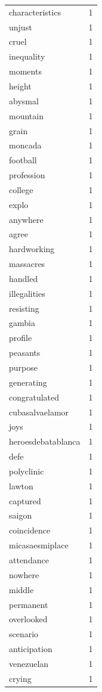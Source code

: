 \begin{tabular}{lr}
characteristics & 1 \\
unjust & 1 \\
cruel & 1 \\
inequality & 1 \\
moments & 1 \\
height & 1 \\
abysmal & 1 \\
mountain & 1 \\
grain & 1 \\
moncada & 1 \\
football & 1 \\
profession & 1 \\
college & 1 \\
explo & 1 \\
anywhere & 1 \\
agree & 1 \\
hardworking & 1 \\
massacres & 1 \\
handled & 1 \\
illegalities & 1 \\
resisting & 1 \\
gambia & 1 \\
profile & 1 \\
peasants & 1 \\
purpose & 1 \\
generating & 1 \\
congratulated & 1 \\
cubasalvaelamor & 1 \\
joys & 1 \\
heroesdebatablanca & 1 \\
defe & 1 \\
polyclinic & 1 \\
lawton & 1 \\
captured & 1 \\
saigon & 1 \\
coincidence & 1 \\
micasaesmiplace & 1 \\
attendance & 1 \\
nowhere & 1 \\
middle & 1 \\
permanent & 1 \\
overlooked & 1 \\
scenario & 1 \\
anticipation & 1 \\
venezuelan & 1 \\
crying & 1 \\

\end{tabular}
